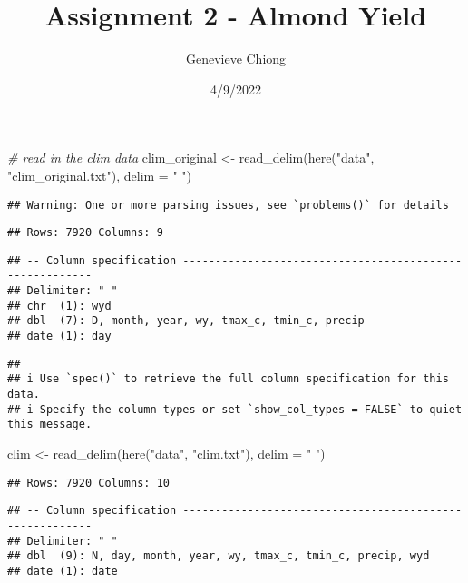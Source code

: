 \documentclass[
]{article}
\title{Assignment 2 - Almond Yield}
\author{Genevieve Chiong}
\date{4/9/2022}
\newenvironment{Shaded}{\begin{snugshade}}{\end{snugshade}}
\newcommand{\AttributeTok}[1]{\textcolor[rgb]{0.77,0.63,0.00}{#1}}
\newcommand{\CommentTok}[1]{\textcolor[rgb]{0.56,0.35,0.01}{\textit{#1}}}
\newcommand{\FunctionTok}[1]{\textcolor[rgb]{0.00,0.00,0.00}{#1}}
\newcommand{\NormalTok}[1]{#1}
\newcommand{\OtherTok}[1]{\textcolor[rgb]{0.56,0.35,0.01}{#1}}
\newcommand{\StringTok}[1]{\textcolor[rgb]{0.31,0.60,0.02}{#1}}
\begin{document}
\maketitle

\begin{Shaded}
\begin{Highlighting}[]
\CommentTok{\# read in the clim data }
\NormalTok{clim\_original }\OtherTok{\textless{}{-}} \FunctionTok{read\_delim}\NormalTok{(}\FunctionTok{here}\NormalTok{(}\StringTok{"data"}\NormalTok{, }\StringTok{"clim\_original.txt"}\NormalTok{), }\AttributeTok{delim =} \StringTok{" "}\NormalTok{)}
\end{Highlighting}
\end{Shaded}

\begin{verbatim}
## Warning: One or more parsing issues, see `problems()` for details
\end{verbatim}

\begin{verbatim}
## Rows: 7920 Columns: 9
\end{verbatim}

\begin{verbatim}
## -- Column specification --------------------------------------------------------
## Delimiter: " "
## chr  (1): wyd
## dbl  (7): D, month, year, wy, tmax_c, tmin_c, precip
## date (1): day
\end{verbatim}

\begin{verbatim}
## 
## i Use `spec()` to retrieve the full column specification for this data.
## i Specify the column types or set `show_col_types = FALSE` to quiet this message.
\end{verbatim}

\begin{Shaded}
\begin{Highlighting}[]
\NormalTok{clim }\OtherTok{\textless{}{-}} \FunctionTok{read\_delim}\NormalTok{(}\FunctionTok{here}\NormalTok{(}\StringTok{"data"}\NormalTok{, }\StringTok{"clim.txt"}\NormalTok{), }\AttributeTok{delim =} \StringTok{" "}\NormalTok{)}
\end{Highlighting}
\end{Shaded}

\begin{verbatim}
## Rows: 7920 Columns: 10
\end{verbatim}

\begin{verbatim}
## -- Column specification --------------------------------------------------------
## Delimiter: " "
## dbl  (9): N, day, month, year, wy, tmax_c, tmin_c, precip, wyd
## date (1): date
\end{verbatim}
\end{document}
